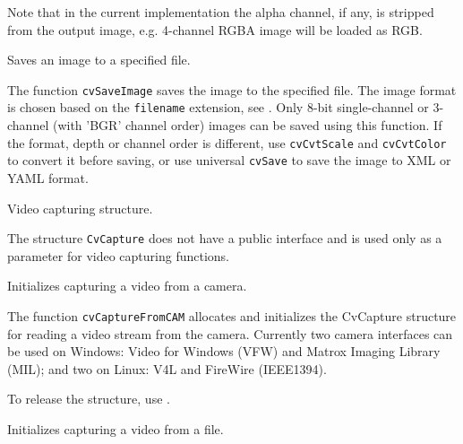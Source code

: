 Note that in the current implementation the alpha channel, if any, is stripped from the output image, e.g. 4-channel RGBA image will be loaded as RGB.

Saves an image to a specified file.


\begin{description}
\end{description}

The function \texttt{cvSaveImage} saves the image to the specified file. The image format is chosen based on the \texttt{filename} extension, see . Only 8-bit single-channel or 3-channel (with 'BGR' channel order) images can be saved using this function. If the format, depth or channel order is different, use \texttt{cvCvtScale} and \texttt{cvCvtColor} to convert it before saving, or use universal \texttt{cvSave} to save the image to XML or YAML format.


\label{CvCapture}
Video capturing structure.


The structure \texttt{CvCapture} does not have a public interface and is used only as a parameter for video capturing functions.

Initializes capturing a video from a camera.


\begin{description}
\end{description}

The function \texttt{cvCaptureFromCAM} allocates and initializes the CvCapture structure for reading a video stream from the camera. Currently two camera interfaces can be used on Windows: Video for Windows (VFW) and Matrox Imaging Library (MIL); and two on Linux: V4L and FireWire (IEEE1394).

To release the structure, use .


Initializes capturing a video from a file.

